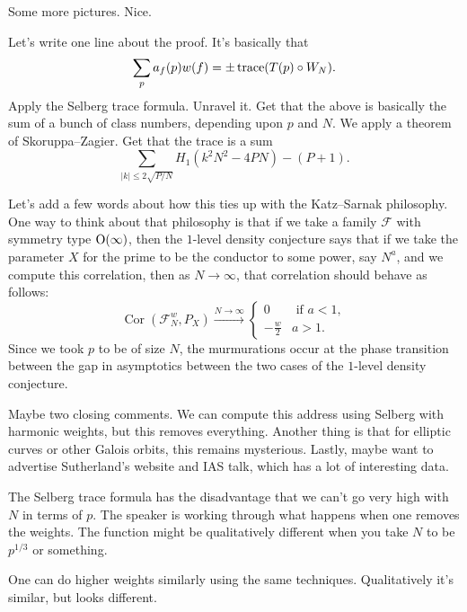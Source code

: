 \documentclass[reqno]{amsart} 
\begin{document}
Some more pictures.  Nice.

Let's write one line about the proof.  It's basically that
\begin{equation*}
  \sum_{p} a_f (p) w (f)
  =
  \pm \operatorname{trace} (T (p) \circ W_N ).
\end{equation*}
Apply the Selberg trace formula.  Unravel it.  Get that the above is basically the sum of a bunch of class numbers, depending upon $p$ and $N$.  We apply a theorem of Skoruppa--Zagier.  Get that the trace is a sum
\begin{equation*}
  \sum_{\lvert k \rvert \leq 2 \sqrt{P / N}}
  H_1 (k^2 N^2 - 4 P N)
  - (P + 1).
\end{equation*}

Let's add a few words about how this ties up with the Katz--Sarnak philosophy.  One way to think about that philosophy is that if we take a family $\mathcal{F}$ with symmetry type $\operatorname{O}(\infty)$, then the $1$-level density conjecture says that if we take the parameter $X$ for the prime to be the conductor to some power, say $N^a$, and we compute this correlation, then as $N \rightarrow \infty$, that correlation should behave as follows:
\begin{equation*}
  \operatorname{Cor} (\mathcal{F}_N^w , P_X ) \xrightarrow{N \rightarrow \infty }
  \begin{cases}
0 & \text{ if } a < 1, \\
- \frac{w}{2} & a > 1.
\end{cases}
\end{equation*}
Since we took $p$ to be of size $N$, the murmurations occur at the phase transition between the gap in asymptotics between the two cases of the $1$-level density conjecture.

Maybe two closing comments.  We can compute this address using Selberg with harmonic weights, but this removes everything.
Another thing is that for elliptic curves or other Galois orbits, this remains mysterious.  Lastly, maybe want to advertise Sutherland's website and IAS talk, which has a lot of interesting data.

The Selberg trace formula has the disadvantage that we can't go very high with $N$ in terms of $p$.  The speaker is working through what happens when one removes the weights.  The function might be qualitatively different when you take $N$ to be $p^{1/3} $ or something.

One can do higher weights similarly using the same techniques.  Qualitatively it's similar, but looks different.  
\end{document}
